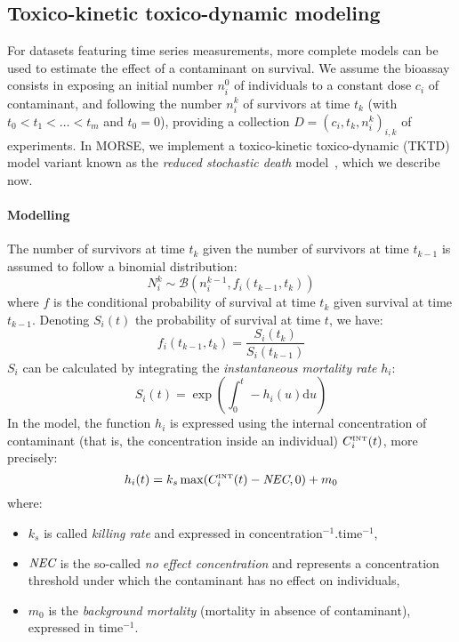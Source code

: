 \documentclass{article}
\begin{document}
\subsection{Toxico-kinetic toxico-dynamic modeling}

For datasets featuring time series measurements, more complete models
can be used to estimate the effect of a contaminant on survival. We
assume the bioassay consists in exposing an initial number $n_i^0$ of
individuals to a constant dose $c_i$ of contaminant, and following the
number $n_i^k$ of survivors at time $t_k$ (with $t_0 < t_1 < \dots <
t_m$ and $t_0 = 0$), providing a collection $D = {(c_i, t_k,
  n_i^k)}_{i,k}$ of experiments. In MORSE, we implement a
toxico-kinetic toxico-dynamic (TKTD) model variant known as the
\emph{reduced stochastic death} model~\cite{nyman2012}, which we
describe now.

\newcommand*{\diffdchar}{\mathrm{d}}
\newcommand*{\dd}{\mathop{\diffdchar\!}}
\newcommand*{\NEC}{\mbox{\it NEC}}
\newcommand*{\Cint}{C^{\mbox{\tiny INT}}}
\newcommand*{\tNEC}{t^{\tiny \NEC}}


\paragraph{Modelling} The number of survivors at time $t_k$ given the
number of survivors at time $t_{k-1}$ is assumed to follow a binomial
distribution:
$$
N_i^k \sim \mathcal{B}(n_i^{k-1}, f_i(t_{k-1}, t_k))
$$
where $f$ is the conditional probability of survival at time $t_k$
given survival at time $t_{k-1}$. Denoting $S_i(t)$ the probability
of survival at time $t$, we have:
$$
f_i(t_{k-1}, t_k) = \frac{S_i(t_k)}{S_i(t_{k-1})}
$$
$S_i$ can be calculated by integrating the \emph{instantaneous mortality
rate} $h_i$:
\begin{equation}
  \label{eq:survivaldef}
  S_i(t) = \exp \left(\int_0^t - h_i(u)\mbox{d}u \right)
\end{equation}
In the model, the function $h_i$ is expressed using the internal
concentration of contaminant (that is, the concentration inside an
individual) $\Cint_i(t)$, more precisely:
$$
h_i(t) = k_s \max(\Cint_i(t) - \NEC, 0) + m_0
$$
where:
\begin{itemize}
\item $k_s$ is called \emph{killing rate} and expressed in
  concentration$^{-1}$.time$^{-1}$,
\item $\NEC$ is the so-called \emph{no effect concentration} and
  represents a concentration threshold under which the contaminant has
  no effect on individuals,
\item $m_0$ is the \emph{background mortality} (mortality in absence of
  contaminant), expressed in time$^{-1}$.
\end{itemize}
\end{document}
